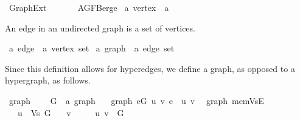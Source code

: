 %
\begin{isabellebody}%
%
%
\isadelimtheory
%
\endisadelimtheory
%
\isatagtheory
{}\isamarkupfalse%
\ Graph{\isacharunderscore}{\kern0pt}Ext\isanewline
\ \ \isanewline
\ \ \ \ AGF{\isachardot}{\kern0pt}Berge\isanewline
{}%
\endisatagtheory
{\isafoldtheory}%
%
\isadelimtheory
\isanewline
%
\endisadelimtheory
\isanewline
{}\isamarkupfalse%
\ {\isacharprime}{\kern0pt}a\ vertex\ {\isacharequal}{\kern0pt}\ {\isacharprime}{\kern0pt}a%
\begin{isamarkuptext}%
An edge in an undirected graph is a set of vertices.%
\end{isamarkuptext}\isamarkuptrue%
\isamarkupfalse%
\ {\isacharprime}{\kern0pt}a\ edge\ {\isacharequal}{\kern0pt}\ {\isachardoublequoteopen}{\isacharprime}{\kern0pt}a\ vertex\ set{\isachardoublequoteclose}\isanewline
\isanewline
{}\isamarkupfalse%
\ {\isacharprime}{\kern0pt}a\ graph\ {\isacharequal}{\kern0pt}\ {\isachardoublequoteopen}{\isacharprime}{\kern0pt}a\ edge\ set{\isachardoublequoteclose}%
\begin{isamarkuptext}%
Since this definition allows for hyperedges, we define a graph, as opposed to a hypergraph, as
follows.%
\end{isamarkuptext}\isamarkuptrue%
\isamarkupfalse%
\ graph\ {\isacharequal}{\kern0pt}\isanewline
\ \ \ G\ {\isacharcolon}{\kern0pt}{\isacharcolon}{\kern0pt}\ {\isachardoublequoteopen}{\isacharprime}{\kern0pt}a\ graph{\isachardoublequoteclose}\isanewline
\ \ \ graph{\isacharcolon}{\kern0pt}\ {\isachardoublequoteopen}{\isasymforall}e{\isasymin}G{\isachardot}{\kern0pt}\ {\isasymexists}u\ v{\isachardot}{\kern0pt}\ e\ {\isacharequal}{\kern0pt}\ {\isacharbraceleft}{\kern0pt}u{\isacharcomma}{\kern0pt}\ v{\isacharbraceright}{\kern0pt}{\isachardoublequoteclose}\isanewline
%
\isadeliminvisible
\isanewline
%
\endisadeliminvisible
%
\isataginvisible
{}\isamarkupfalse%
\ {\isacharparenleft}{\kern0pt}\ graph{\isacharparenright}{\kern0pt}\ mem{\isacharunderscore}{\kern0pt}VsE{\isacharcolon}{\kern0pt}\isanewline
\ \ \ {\isachardoublequoteopen}u\ {\isasymin}\ Vs\ G{\isachardoublequoteclose}\isanewline
\ \ \ v\ \isanewline
\ \ \ \ {\isachardoublequoteopen}{\isacharbraceleft}{\kern0pt}u{\isacharcomma}{\kern0pt}\ v{\isacharbraceright}{\kern0pt}\ {\isasymin}\ G{\isachardoublequoteclose}%

\end{isabellebody}
